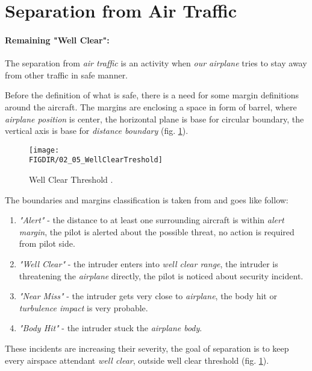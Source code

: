 \section{Separation from Air Traffic}\label{sec:WellClear}

\paragraph{Remaining "Well Clear":} The separation from \emph{air traffic} is an activity when \emph{our airplane} tries to stay away from other traffic in safe manner.  

Before the definition of what is safe, there is a need for some margin definitions around the aircraft. The margins are enclosing a space in form of barrel, where \emph{airplane position} is center, the horizontal plane is base for circular boundary, the vertical axis is base for \emph{distance boundary} (fig. \ref{fig:WellClearTreshold}).

\begin{figure}[H]
    \centering
    \texttt{[image: \\FIGDIR/02\_05\_WellClearTreshold]}
    \caption{Well Clear Threshold \cite{valavanis2015uav,united1983pilots}.}
    \label{fig:WellClearTreshold}
\end{figure}

\noindent The boundaries and margins classification is taken from \cite{united1983pilots,valavanis2015uav} and goes like follow:

\begin{enumerate}
    \item \emph{"Alert"} - the distance to at least one surrounding aircraft is within \emph{alert margin}, the pilot is alerted about the possible threat, no action is required from pilot side.
    
    \item \emph{"Well Clear"} - the intruder enters into \emph{well clear range}, the intruder is threatening the \emph{airplane} directly, the pilot is noticed about security incident.
    
    \item \emph{"Near Miss"} - the intruder gets very close to \emph{airplane}, the body hit or \emph{turbulence impact} is very probable. 
    
    \item \emph{"Body Hit"} - the intruder stuck the \emph{airplane body}.
\end{enumerate}

\noindent These incidents are increasing their severity, the goal of separation is to keep every airspace attendant \emph{well clear}, outside well clear threshold (fig. \ref{fig:WellClearTreshold}). 
